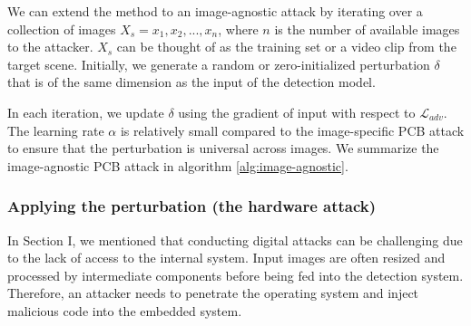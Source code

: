 
We can extend the method to an image-agnostic attack by iterating over a collection of images $X_{s} = {x_{1}, x_{2}, ..., x_{n}}$, where $n$ is the number of available images to the attacker. $X_{s}$ can be thought of as the training set or a video clip from the target scene. Initially, we generate a random or zero-initialized perturbation $\delta$ that is of the same dimension as the input of the detection model. 

In each iteration, we update $\delta$ using the gradient of input with respect to $\mathcal{L}_{adv}$. The learning rate $\alpha$ is relatively small compared to the image-specific PCB attack to ensure that the perturbation is universal across images. We summarize the image-agnostic PCB attack in algorithm \ref{alg:image-agnostic}.


\subsubsection{Applying the perturbation (the hardware attack)}

In Section I, we mentioned that conducting digital attacks can be challenging due to the lack of access to the internal system. Input images are often resized and processed by intermediate components before being fed into the detection system. Therefore, an attacker needs to penetrate the operating system and inject malicious code into the embedded system. 


